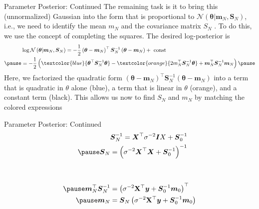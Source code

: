 \documentclass{beamer}
\begin{document}
\begin{frame}{Parameter Posterior: Continued}
The remaining task is it to bring this (unnormalized) Gaussian into the form that is proportional to $\mathcal{N}\left(\boldsymbol{\theta} | \boldsymbol{m}_{N}, \boldsymbol{S}_{N}\right)$, i.e., we need to identify the
mean $m_{N}$ and the covariance matrix $S_{N}$ . To do this, we use the concept of completing the squares. The desired log-posterior is \pause
\begin{equation*}
\begin{aligned}
&\log \mathcal{N}\left(\boldsymbol{\theta} | \boldsymbol{m}_{N}, \boldsymbol{S}_{N}\right)=-\frac{1}{2}\left(\boldsymbol{\theta}-\boldsymbol{m}_{N}\right)^{\top} \boldsymbol{S}_{N}^{-1}\left(\boldsymbol{\theta}-\boldsymbol{m}_{N}\right)+\text { const }\\
\pause
&=-\frac{1}{2}\left(\textcolor{blue}{\boldsymbol{\theta}^{\top} \boldsymbol{S}_{N}^{-1} \boldsymbol{\theta}}-\textcolor{orange}{2 m_{N}^{\top} \boldsymbol{S}_{N}^{-1} \boldsymbol{\theta}}+\boldsymbol{m}_{N}^{\top} \boldsymbol{S}_{N}^{-1} \boldsymbol{m}_{N}\right)
\pause
\end{aligned}
\end{equation*}
Here, we factorized the quadratic form $\left(\boldsymbol{\theta}-\boldsymbol{m}_{N}\right)^{\top} \boldsymbol{S}_{N}^{-1}\left(\boldsymbol{\theta}-\boldsymbol{m}_{N}\right)$ into a term that is quadratic in $\theta$ alone (blue), a term that is linear in $\theta$ (orange), and a constant term (black). This allows us now to find $S_{N}$ and $m_{N}$ by matching the colored expressions
\end{frame}

\begin{frame}{Parameter Posterior: Continued}
\begin{equation*}
\begin{aligned}
& \boldsymbol{S}_{N}^{-1}=\boldsymbol{X}^{\top} \sigma^{-2} \boldsymbol{I} X+\boldsymbol{S}_{0}^{-1}\\
\pause
\boldsymbol{S}_{N}&=\left(\sigma^{-2} \boldsymbol{X}^{\top} \boldsymbol{X}+\boldsymbol{S}_{0}^{-1}\right)^{-1}\\
\vspace{5em}\\\\
\pause
\boldsymbol{m}_{N}^{\top} \boldsymbol{S}_{N}^{-1}&=\left(\sigma^{-2} \mathbf{X}^{\top} \boldsymbol{y}+\boldsymbol{S}_{0}^{-1} \boldsymbol{m}_{0}\right)^{\top}\\
\pause
\boldsymbol{m}_{N}&=\boldsymbol{S}_{N}\left(\sigma^{-2} \mathbf{X}^{\top} \boldsymbol{y}+\boldsymbol{S}_{0}^{-1} \boldsymbol{m}_{0}\right)
\end{aligned}
\end{equation*}
\end{frame}
\end{document}
